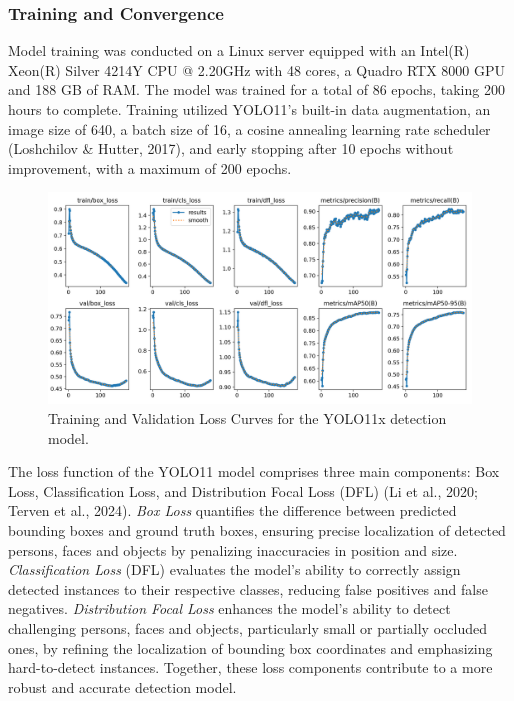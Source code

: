 \documentclass[
  man,floatsintext]{apa6}
\begin{document}
\subsubsection{Training and Convergence}\label{training-face}

Model training was conducted on a Linux server equipped with an Intel(R) Xeon(R) Silver 4214Y CPU @ 2.20GHz with 48 cores, a Quadro RTX 8000 GPU and 188 GB of RAM. The model was trained for a total of 86 epochs, taking 200 hours to complete. Training utilized YOLO11's built-in data augmentation, an image size of 640, a batch size of 16, a cosine annealing learning rate scheduler (Loshchilov \& Hutter, 2017), and early stopping after 10 epochs without improvement, with a maximum of 200 epochs.

\begin{figure}

{\centering \includegraphics[width=450px]{images/yolo_loss_curves} 

}

\caption{Training and Validation Loss Curves for the YOLO11x detection model.}\label{fig:det-loss-curves}
\end{figure}

The loss function of the YOLO11 model comprises three main components: Box Loss, Classification Loss, and Distribution Focal Loss (DFL) (Li et al., 2020; Terven et al., 2024). \emph{Box Loss} quantifies the difference between predicted bounding boxes and ground truth boxes, ensuring precise localization of detected persons, faces and objects by penalizing inaccuracies in position and size. \emph{Classification Loss} (DFL) evaluates the model's ability to correctly assign detected instances to their respective classes, reducing false positives and false negatives. \emph{Distribution Focal Loss} enhances the model's ability to detect challenging persons, faces and objects, particularly small or partially occluded ones, by refining the localization of bounding box coordinates and emphasizing hard-to-detect instances. Together, these loss components contribute to a more robust and accurate detection model.
\end{document}
